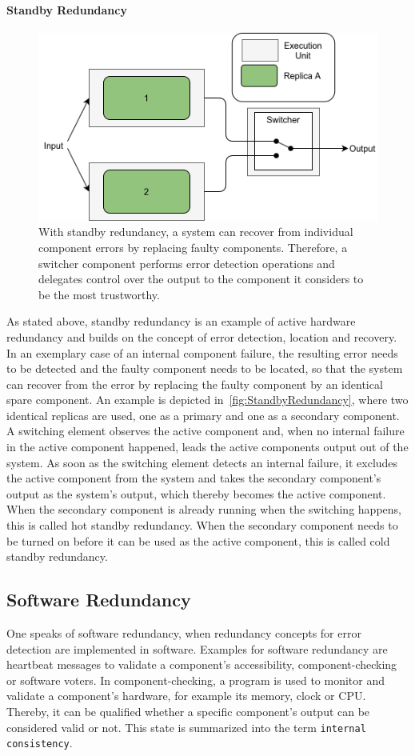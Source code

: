 \paragraph{Standby Redundancy}
\begin{figure}[!hb]
	\centering
	\includegraphics[width=0.75\linewidth]{images/ActiveSelectionRedundancy}
	\caption{With standby redundancy, a system can recover from individual component errors by replacing faulty components. Therefore, a switcher component performs error detection operations and delegates control over the output to the component it considers to be the most trustworthy.}
	\label{fig:StandbyRedundancy}
\end{figure}

As stated above, standby redundancy is an example of active hardware redundancy and builds on the concept of error detection, location and recovery.
In an exemplary case of an internal component failure, the resulting error needs to be detected and the faulty component needs to be located, so that the system can recover from the error by replacing the faulty component by an identical spare component.
An example is depicted in~\autoref{fig:StandbyRedundancy}, where two identical replicas are used, one as a primary and one as a secondary component.
A switching element observes the active component and, when no internal failure in the active component happened, leads the active components output out of the system.
As soon as the switching element detects an internal failure, it excludes the active component from the system and takes the secondary component's output as the system's output, which thereby becomes the active component.
When the secondary component is already running when the switching happens, this is called hot standby redundancy.
When the secondary component needs to be turned on before it can be used as the active component, this is called cold standby redundancy.

\subsection{Software Redundancy}
One speaks of software redundancy, when redundancy concepts for error detection are implemented in software.
Examples for software redundancy are heartbeat messages to validate a component's accessibility, component-checking or software voters.
In component-checking, a program is used to monitor and validate a component's hardware, for example its memory, clock or \gls*{CPU}.
Thereby, it can be qualified whether a specific component's output can be considered valid or not.
This state is summarized into the term \texttt{internal consistency}.

